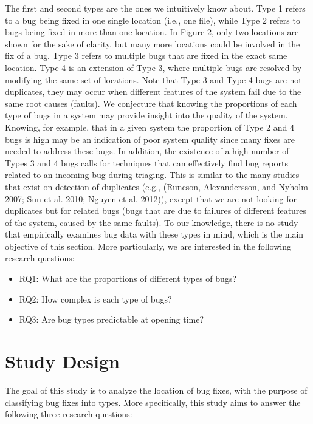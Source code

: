\documentclass[natbib]{svjour3}
\begin{document}
The first and second types are the ones we intuitively know about. Type
1 refers to a bug being fixed in one single location (i.e., one file),
while Type 2 refers to bugs being fixed in more than one location. In
Figure 2, only two locations are shown for the sake of clarity, but many
more locations could be involved in the fix of a bug. Type 3 refers to
multiple bugs that are fixed in the exact same location. Type 4 is an
extension of Type 3, where multiple bugs are resolved by modifying the
same set of locations. Note that Type 3 and Type 4 bugs are not
duplicates, they may occur when different features of the system fail
due to the same root causes (faults). We conjecture that knowing the
proportions of each type of bugs in a system may provide insight into
the quality of the system. Knowing, for example, that in a given system
the proportion of Type 2 and 4 bugs is high may be an indication of poor
system quality since many fixes are needed to address these bugs. In
addition, the existence of a high number of Types 3 and 4 bugs calls for
techniques that can effectively find bug reports related to an incoming
bug during triaging. This is similar to the many studies that exist on
detection of duplicates (e.g., (Runeson, Alexandersson, and Nyholm 2007;
Sun et al. 2010; Nguyen et al. 2012)), except that we are not looking
for duplicates but for related bugs (bugs that are due to failures of
different features of the system, caused by the same faults). To our
knowledge, there is no study that empirically examines bug data with
these types in mind, which is the main objective of this section. More
particularly, we are interested in the following research questions:

\begin{itemize}
    \item RQ1: What are the proportions of different types of bugs?
    \item RQ2: How complex is each type of bugs?
    \item RQ3: Are bug types predictable at opening time?
\end{itemize}

\section{Study Design}\label{study-design}

The goal of this study is to analyze the location of bug fixes, with the
purpose of classifying bug fixes into types. More specifically, this
study aims to answer the following three research questions:
\end{document}
